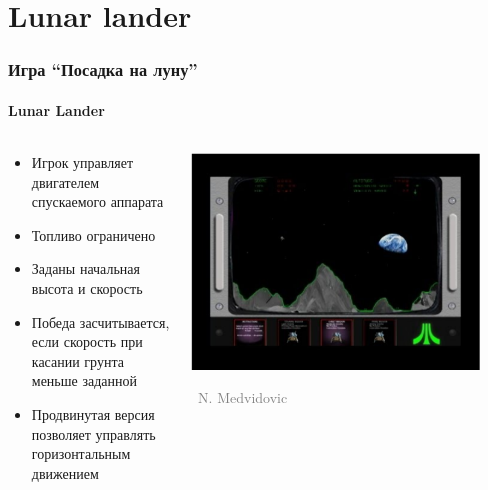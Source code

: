 \documentclass[xetex,mathserif,serif]{beamer}
\newcommand{\attribution}[1] {
    \vspace{-5mm}\begin{flushright}\begin{scriptsize}\textcolor{gray}{\textcopyright\, #1}\end{scriptsize}\end{flushright}
}
\begin{document}
    \section{Lunar lander}

    \begin{frame}
        \frametitle{Игра ``Посадка на луну''}
        \framesubtitle{Lunar Lander}
        \begin{columns}
            \begin{column}{0.5\textwidth}
                \begin{itemize}
                    \item Игрок управляет двигателем спускаемого аппарата
                    \item Топливо ограничено
                    \item Заданы начальная высота и скорость
                    \item Победа засчитывается, если скорость при касании грунта меньше заданной
                    \item Продвинутая версия позволяет управлять горизонтальным движением
                \end{itemize}
            \end{column}
            \begin{column}{0.5\textwidth}
                \begin{center}
                    \includegraphics[width=0.9\textwidth]{lunarLander.png}
                    \attribution{N. Medvidovic}
                \end{center}
            \end{column}
        \end{columns}
    \end{frame}
\end{document}

